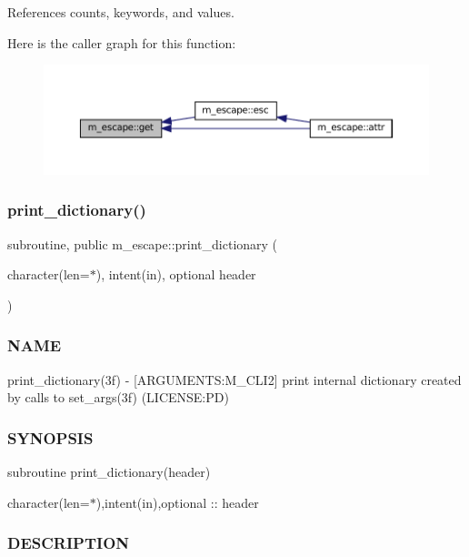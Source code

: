 References counts, keywords, and values.

Here is the caller graph for this function\+:\nopagebreak
\begin{figure}[H]
\begin{center}
\leavevmode
\includegraphics[width=350pt]{namespacem__escape_af555c90c278ff964d8bce93ee0368a42_icgraph}
\end{center}
\end{figure}
\mbox{\label{namespacem__escape_a6add907828fd34e94b87f643a5cabc64}} 
\subsubsection{\texorpdfstring{print\+\_\+dictionary()}{print\_dictionary()}}
{\footnotesize\ttfamily subroutine, public m\+\_\+escape\+::print\+\_\+dictionary (\begin{DoxyParamCaption}\item[{character(len=$\ast$), intent(in), optional}]{header }\end{DoxyParamCaption})}



\subsubsection*{N\+A\+ME}

print\+\_\+dictionary(3f) -\/ \mbox{[}A\+R\+G\+U\+M\+E\+N\+TS\+:M\+\_\+\+C\+L\+I2\mbox{]} print internal dictionary created by calls to set\+\_\+args(3f) (L\+I\+C\+E\+N\+SE\+:PD) \subsubsection*{S\+Y\+N\+O\+P\+S\+IS}

subroutine print\+\_\+dictionary(header)

character(len=$\ast$),intent(in),optional \+:\+: header \subsubsection*{D\+E\+S\+C\+R\+I\+P\+T\+I\+ON}

